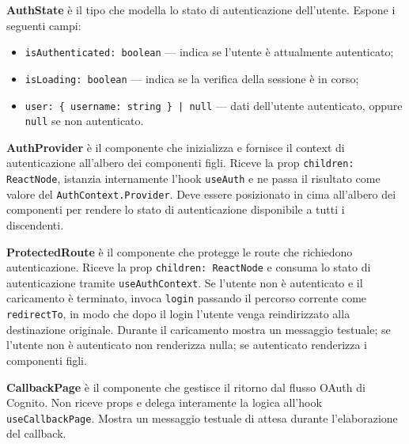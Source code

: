 \documentclass[a4paper, 11pt]{article}
\newcounter{subsubsubsection}[subsubsection]
\newcounter{subsubsubsubsection}[subsubsubsection]
\begin{document}

\textbf{AuthState} è il tipo che modella lo stato di autenticazione dell'utente. Espone i
seguenti campi:
\begin{itemize}
  \item \texttt{isAuthenticated: boolean} — indica se l'utente è attualmente autenticato;
  \item \texttt{isLoading: boolean} — indica se la verifica della sessione è in corso;
  \item \texttt{user: \{ username: string \} | null} — dati dell'utente autenticato, oppure
        \texttt{null} se non autenticato.
\end{itemize}


\textbf{AuthProvider} è il componente che inizializza e fornisce il context di autenticazione
all'albero dei componenti figli. Riceve la prop \texttt{children: ReactNode}, istanzia
internamente l'hook \texttt{useAuth} e ne passa il risultato come valore del
\texttt{AuthContext.Provider}. Deve essere posizionato in cima all'albero dei componenti per
rendere lo stato di autenticazione disponibile a tutti i discendenti.

\textbf{ProtectedRoute} è il componente che protegge le route che richiedono autenticazione.
Riceve la prop \texttt{children: ReactNode} e consuma lo stato di autenticazione tramite
\texttt{useAuthContext}. Se l'utente non è autenticato e il caricamento è terminato, invoca
\texttt{login} passando il percorso corrente come \texttt{redirectTo}, in modo che dopo il
login l'utente venga reindirizzato alla destinazione originale. Durante il caricamento mostra
un messaggio testuale; se l'utente non è autenticato non renderizza nulla; se autenticato
renderizza i componenti figli.

\textbf{CallbackPage} è il componente che gestisce il ritorno dal flusso OAuth di Cognito.
Non riceve props e delega interamente la logica all'hook \texttt{useCallbackPage}. Mostra
un messaggio testuale di attesa durante l'elaborazione del callback.

\end{document}
